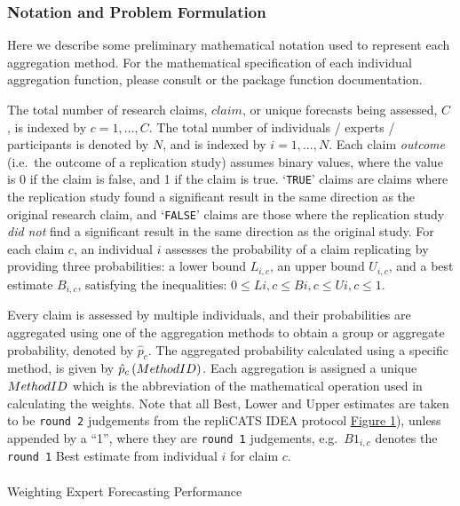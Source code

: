 \documentclass[article]{jss}
\makeatletter
\let\oldparagraph\paragraph
\renewcommand{\paragraph}{
    \@ifstar
      \xxxParagraphStar
      \xxxParagraphNoStar
  }
\newcommand{\xxxParagraphStar}[1]{\oldparagraph*{#1}\mbox{}}
\newcommand{\xxxParagraphNoStar}[1]{\oldparagraph{#1}\mbox{}}
\makeatother
\begin{document}
\subsubsection{Notation and Problem
Formulation}\label{notation-and-problem-formulation}

Here we describe some preliminary mathematical notation used to
represent each aggregation method. For the mathematical specification of
each individual aggregation function, please consult \citep{Hanea2021}
or the  package function documentation.

The total number of research claims, \(claim\), or unique forecasts
being assessed, \(C\) , is indexed by \(c = 1, ..., C\). The total
number of individuals / experts / participants is denoted by \(N\), and
is indexed by \(i = 1, ..., N\). Each claim \emph{outcome} (i.e.~the
outcome of a replication study) assumes binary values, where the value
is 0 if the claim is false, and 1 if the claim is true. `\texttt{TRUE}'
claims are claims where the replication study found a significant result
in the same direction as the original research claim, and
`\texttt{FALSE}' claims are those where the replication study \emph{did
not} find a significant result in the same direction as the original
study. For each claim \(c\), an individual \(i\) assesses the
probability of a claim replicating by providing three probabilities: a
lower bound \({L}_{i,c}\), an upper bound \({U}_{i,c}\), and a best
estimate \(B_{i,c}\), satisfying the inequalities:
\(0 \le Li,c \le Bi,c \le Ui,c \le 1\).

Every claim is assessed by multiple individuals, and their probabilities
are aggregated using one of the aggregation methods to obtain a group or
aggregate probability, denoted by \(\hat{p}_c\). The aggregated
probability calculated using a specific method, is given by
\(\hat{p}_{c}\left(Method \space ID \right)\). Each aggregation is
assigned a unique \(Method \space ID\) which is the abbreviation of the
mathematical operation used in calculating the weights. Note that all
Best, Lower and Upper estimates are taken to be \texttt{round\ 2}
judgements from the repliCATS IDEA protocol \hyperref[fig1]{Figure 1}),
unless appended by a ``1'', where they are \texttt{round\ 1} judgements,
e.g.~\(B1_{i,c}\) denotes the \texttt{round\ 1} Best estimate from
individual \(i\) for claim \(c\).

\paragraph{Weighting Expert Forecasting
Performance}\label{weighting-expert-forecasting-performance}
\end{document}

